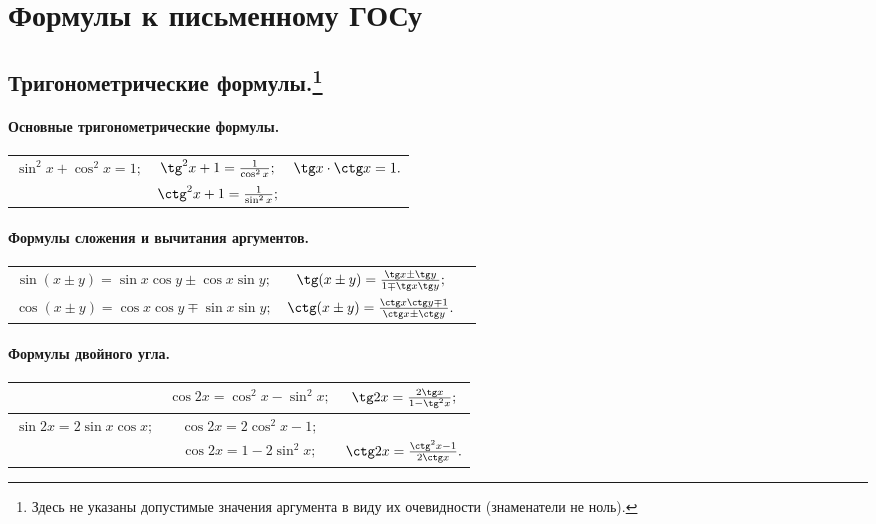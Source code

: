 

\everymath{\displaystyle}

\chapter{Формулы к письменному ГОСу}

\section[Тригонометрические формулы.]{Тригонометрические формулы.\footnote{Здесь не указаны допустимые значения аргумента в виду их очевидности (знаменатели не ноль).}}
\subsubsection{Основные тригонометрические формулы.}
\renewcommand*{\arraystretch}{2}
\noindent\begin{tabular}{ c c c }
\multirow{2}{*}{$\sin^2x+\cos^2x=1;$}
&
$\tg^2x+1=\frac{1}{\cos^2x};$
&
\multirow{2}{*}{$\tg x\cdot\ctg x=1.$}
\\
&
$\ctg^2x+1=\frac{1}{\sin^2x};$
&
\end{tabular}
\subsubsection{Формулы сложения и вычитания аргументов.}
\noindent\begin{tabular}{ c c c}
$\sin(x\pm y)=\sin x \cos y \pm \cos x \sin y;$
&
$\tg(x\pm y)=\frac{\tg x \pm \tg y}{1 \mp \tg x\tg y};$
\\
$\cos(x\pm y)= \cos x \cos y \mp \sin x \sin y;$
&
$\ctg(x\pm y)=\frac{\ctg x\ctg y \mp 1}{\ctg x \pm \ctg y}.$
\end{tabular}
\subsubsection{Формулы двойного угла.}
\noindent\begin{tabular}{ |c |c |c| }
&
$\cos 2x = \cos^2 x - \sin^2 x;$
&
\multirow{1}{*}{$\tg 2x = \frac{2\tg x}{1-\tg^2x};$}
\\\hline
$\sin 2x = 2\sin x \cos x;$
&
$\cos 2x = 2\cos^2 x - 1; $
&
\\\hline
&
$\cos 2x = 1 - 2\sin^2 x;$
&
$\ctg 2x = \frac{\ctg^2x-1}{2\ctg x}.$
\end{tabular}
